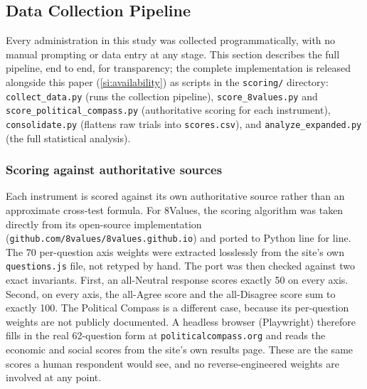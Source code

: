 \documentclass[12pt]{article}
\begin{document}
\subsection{Data Collection Pipeline}
\label{si:data-collection}

Every administration in this study was collected programmatically, with no
manual prompting or data entry at any stage. This section describes the full
pipeline, end to end, for transparency; the complete implementation is
released alongside this paper (\ref{si:availability}) as scripts in
the \texttt{scoring/} directory: \texttt{collect\_data.py} (runs the
collection pipeline), \texttt{score\_8values.py} and
\texttt{score\_political\_compass.py} (authoritative scoring for each
instrument), \texttt{consolidate.py} (flattens raw trials into
\texttt{scores.csv}), and \texttt{analyze\_expanded.py} (the full statistical
analysis).

\subsubsection{Scoring against authoritative sources}
Each instrument is scored against its own authoritative source rather than an approximate cross-test
formula. For 8Values, the scoring algorithm was taken directly from its open-source implementation
(\texttt{github.com/8values/8values.github.io}) and ported to Python line for line. The 70 per-question axis
weights were extracted losslessly from the site's own \texttt{questions.js} file, not retyped by hand. The port was
then checked against two exact invariants. First, an all-Neutral response scores exactly 50 on every axis.
Second, on every axis, the all-Agree score and the all-Disagree score sum to exactly 100. The Political
Compass is a different case, because its per-question weights are not publicly documented. A headless
browser (Playwright) therefore fills in the real 62-question form at \texttt{politicalcompass.org} and reads the
economic and social scores from the site's own results page. These are the same scores a human
respondent would see, and no reverse-engineered weights are involved at any point.
\end{document}
